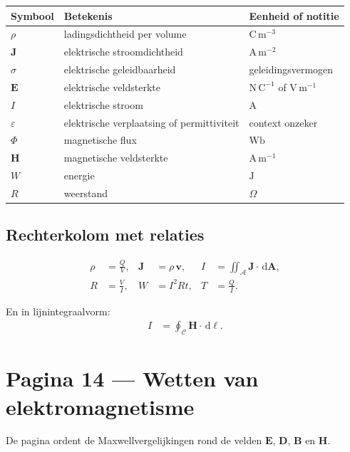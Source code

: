 \documentclass[11pt]{article}
\newcommand{\dd}{\,\mathrm{d}}
\newcommand{\vect}[1]{\mathbf{#1}}
\newcommand{\onzeker}[1]{\textcolor{red!70!black}{#1}}
\begin{document}
\begin{center}
\begin{tabular}{lll}
\toprule
Symbool & Betekenis & Eenheid of notitie \\
\midrule
$\rho$ & ladingsdichtheid per volume & $\mathrm{C\,m^{-3}}$ \\
$\vect{J}$ & elektrische stroomdichtheid & $\mathrm{A\,m^{-2}}$ \\
$\sigma$ & elektrische geleidbaarheid & \onzeker{geleidingsvermogen} \\
$\vect{E}$ & elektrische veldsterkte & $\mathrm{N\,C^{-1}}$ of $\mathrm{V\,m^{-1}}$ \\
$I$ & elektrische stroom & $\mathrm{A}$ \\
$\varepsilon$ & elektrische verplaatsing of permittiviteit & \onzeker{context onzeker} \\
$\Phi$ & magnetische flux & $\mathrm{Wb}$ \\
$\vect{H}$ & magnetische veldsterkte & $\mathrm{A\,m^{-1}}$ \\
$W$ & energie & $\mathrm{J}$ \\
$R$ & weerstand & $\Omega$ \\
\bottomrule
\end{tabular}
\end{center}

\subsection*{Rechterkolom met relaties}

\begin{align*}
\rho
  &=
  \frac{Q}{V},
&
\vect{J}
  &=
  \rho\,\vect{v},
&
I
  &=
  \iint_{\mathcal{A}}\vect{J}\cdot\dd\vect{A},
\\
R
  &=
  \frac{V}{I},
&
W
  &=
  I^2Rt,
&
T
  &=
  \frac{Q}{I}.
\end{align*}

En in lijnintegraalvorm:
\begin{align*}
I
  &=
  \oint_{\mathcal{C}}\vect{H}\cdot\dd\vect{\ell}.
\end{align*}

\section*{Pagina 14 --- Wetten van elektromagnetisme}

De pagina ordent de Maxwellvergelijkingen rond de velden $\vect{E}$, $\vect{D}$, $\vect{B}$ en $\vect{H}$.
\end{document}
